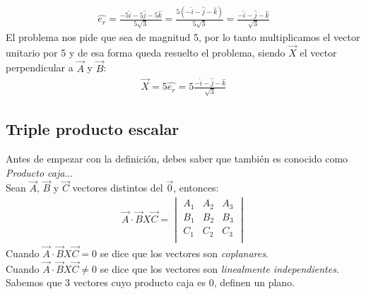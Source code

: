 \documentclass[12pt,openany]{book}
\begin{document}
				\begin{equation*}
				 	\begin{split}
				 		\hat{e_{r}}=\frac{-5\hat{i}-5\hat{j}-5\hat{k}}{5\sqrt{3}}		
				 					=\frac{5(-\hat{i}-\hat{j}-\hat{k})}{5\sqrt{3}}		
				 					=\frac{-\hat{i}-\hat{j}-\hat{k}}{\sqrt{3}}			
				 	\end{split}
				\end{equation*}
				El problema nos pide que sea de magnitud 5, por lo tanto multiplicamos el vector unitario por 5 
				y de esa forma queda resuelto el problema, siendo $\vec{X}$ el vector perpendicular a $\vec{A}$ y 
				$\vec{B}$:
				\begin{equation}
				 	\begin{split}
				 		\vec{X}=5\hat{e_{r}}=5\frac{-\hat{i}-\hat{j}-\hat{k}}{\sqrt{3}}
				 	\end{split}
				\end{equation}
		
		\subsection{Triple producto escalar}
			Antes de empezar con la definici\'on, debes saber que tambi\'en  es conocido como \textsl{Producto caja}...\\
			Sean $\vec{A}$, $\vec{B}$ y $\vec{C}$ vectores distintos del $\vec{0}$, entonces:
			\begin{equation*}
		    	\begin{split}
		    		\vec{A}\cdot\vec{B}X\vec{C}=\begin{vmatrix}
					    							 A_{1}  &  A_{2}  & A_{3}   \\
					    							 B_{1}  &  B_{2}  & B_{3}   \\
					    							 C_{1}  &  C_{2}  & C_{3}   \\
				 	    						\end{vmatrix}
		    	\end{split}
		    \end{equation*}
		    Cuando $\vec{A}\cdot\vec{B}X\vec{C}=0$ se dice que los vectores son \textsl{coplanares}.\\
		    Cuando $\vec{A}\cdot\vec{B}X\vec{C}\neq0$ se dice que los vectores son \textsl{linealmente independientes}.\\
		    Sabemos que 3 vectores cuyo producto caja es 0, definen un plano.
\end{document}
